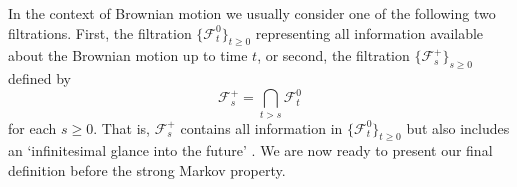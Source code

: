 \documentclass[a4paper,11pt]{article}
\theoremstyle{plain}
\theoremstyle{definition}
\newtheorem{definition}[theorem]{Definition}
\begin{document}
In the context of Brownian motion we usually consider one of the following two filtrations. First, the filtration $\{\mathcal{F}_t^0\}_{t \geq 0}$ representing all information available about the Brownian motion up to time $t$, or second, the filtration $\{\mathcal{F}_s^+\}_{s \geq 0}$ defined by 
\[
\mathcal{F}_s^+ = \bigcap_{t > s} \mathcal{F}_t^0
\]
for each $s \geq 0$. That is, $\mathcal{F}_s^+$ contains all information in $\{\mathcal{F}_t^0\}_{t \geq 0}$ but also includes an `infinitesimal glance into the future' \citep[p.~37--38]{M&P}. We are now ready to present our final definition before the strong Markov property.




\end{document}
